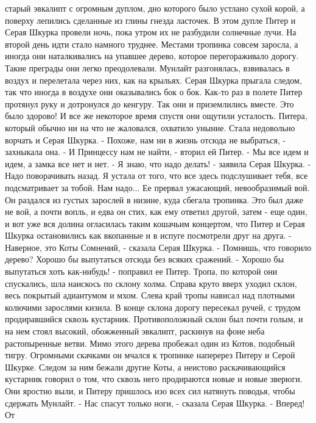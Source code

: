 старый эвкалипт с огромным дуплом, дно которого было устлано сухой 
корой, а поверху лепились сделанные из глины гнезда ласточек. В этом 
дупле Питер и Серая Шкурка провели ночь, пока утром их не разбудили 
солнечные лучи.
    На второй день идти стало намного труднее. Местами тропинка совсем 
заросла, а иногда они наталкивались на упавшее дерево, которое 
перегораживало дорогу. Такие преграды они легко преодолевали. Мунлайт 
разгонялась, взвивалась в воздух и перелетала через них, как на 
крыльях. Серая Шкурка прыгала следом, так что иногда в воздухе они 
оказывались бок о бок. Как-то раз в полете Питер протянул руку и 
дотронулся до кенгуру. Так они и приземлились вместе. Это было 
здорово!
    И все же некоторое время спустя они ощутили усталость. Питера, 
который обычно ни на что не жаловался, охватило уныние. Стала 
недовольно ворчать и Серая Шкурка.
    - Похоже, нам ни в жизнь отсюда не выбраться, - захныкала она.
    - И Принцессу нам не найти, - вторил ей Питер. - Мы все идем и 
идем, а замка все нет и нет.
    - Я знаю, что надо делать! - заявила Серая Шкурка. - Надо 
поворачивать назад. Я устала от того, что все здесь подслушивает тебя, 
все подсматривает за тобой. Нам надо...
    Ее прервал ужасающий, невообразимый вой. Он раздался из густых 
зарослей в низине, куда сбегала тропинка. Это был даже не вой, а почти 
вопль, и едва он стих, как ему ответил другой, затем - еще один, и вот 
уже вся долина огласилась таким кошачьим концертом, что Питер и Серая 
Шкурка остановились как вкопанные и в испуге посмотрели друг на друга.
    - Наверное, это Коты Сомнений, - сказала Серая Шкурка. - Помнишь, 
что говорило дерево? Хорошо бы выпутаться отсюда без всяких сражений.
    - Хорошо бы выпутаться хоть как-нибудь! - поправил ее Питер.
    Тропа, по которой они спускались, шла наискось по склону холма. 
Справа круто вверх уходил склон, весь покрытый адиантумом и мхом. 
Слева край тропы нависал над плотными колючими зарослями кизила. В 
конце склона дорогу пересекал ручей, с трудом продиравшийся сквозь 
кустарник. Противоположный склон был почти голым, и на нем стоял 
высокий, обожженный эвкалипт, раскинув на фоне неба растопыренные 
ветви.
    Мимо этого дерева пробежал один из Котов, подобный тигру. 
Огромными скачками он мчался к тропинке наперерез Питеру и Серой 
Шкурке. Следом за ним бежали другие Коты, а неистово раскачивающийся 
кустарник говорил о том, что сквозь него продираются новые и новые 
зверюги. Они яростно выли, и Питеру пришлось изо всех сил натянуть 
поводья, чтобы сдержать Мунлайт.
    - Нас спасут только ноги, - сказала Серая Шкурка. - Вперед! От 
